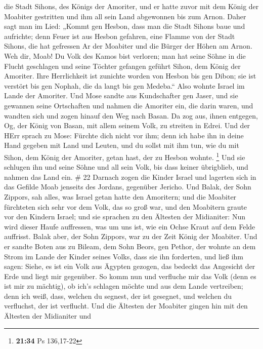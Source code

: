 die Stadt Sihons, des Königs der Amoriter, und er hatte zuvor mit dem
König der Moabiter gestritten und ihm all sein Land abgewonnen bis zum
Arnon.  Daher sagt man im Lied: „Kommt gen Hesbon, dass man
die Stadt Sihons baue und aufrichte;  denn Feuer ist aus
Hesbon gefahren, eine Flamme von der Stadt Sihons, die hat gefressen Ar
der Moabiter und die Bürger der Höhen am Arnon.  Weh dir,
Moab! Du Volk des Kamos bist verloren; man hat seine Söhne in die Flucht
geschlagen und seine Töchter gefangen geführt Sihon, dem König der
Amoriter.  Ihre Herrlichkeit ist zunichte worden von Hesbon
bis gen Dibon; sie ist verstört bis gen Nophah, die da langt bis gen
Medeba.``  Also wohnte Israel im Lande der Amoriter.
 Und Mose sandte aus Kundschafter gen Jaser, und sie
gewannen seine Ortschaften und nahmen die Amoriter ein, die darin waren,
 und wandten sich und zogen hinauf den Weg nach Basan. Da
zog aus, ihnen entgegen, Og, der König von Basan, mit allem seinem Volk,
zu streiten in Edrei.  Und der HErr sprach zu Mose: Fürchte
dich nicht vor ihm; denn ich habe ihn in deine Hand gegeben mit Land und
Leuten, und du sollst mit ihm tun, wie du mit Sihon, dem König der
Amoriter, getan hast, der zu Hesbon wohnte. \footnote{\textbf{21:34} Ps
  136,17-22}  Und sie schlugen ihn und seine Söhne und all
sein Volk, bis dass keiner übrigblieb, und nahmen das Land ein. \# 22
 Darnach zogen die Kinder Israel und lagerten sich in das
Gefilde Moab jenseits des Jordans, gegenüber Jericho.  Und
Balak, der Sohn Zippors, sah alles, was Israel getan hatte den
Amoritern;  und die Moabiter fürchteten sich sehr vor dem
Volk, das so groß war, und den Moabitern graute vor den Kindern Israel;
 und sie sprachen zu den Ältesten der Midianiter: Nun wird
dieser Haufe auffressen, was um uns ist, wie ein Ochse Kraut auf dem
Felde auffrisst. Balak aber, der Sohn Zippors, war zu der Zeit König der
Moabiter.  Und er sandte Boten aus zu Bileam, dem Sohn
Beors, gen Pethor, der wohnte an dem Strom im Lande der Kinder seines
Volks, dass sie ihn forderten, und ließ ihm sagen: Siehe, es ist ein
Volk aus Ägypten gezogen, das bedeckt das Angesicht der Erde und liegt
mir gegenüber.  So komm nun und verfluche mir das Volk (denn
es ist mir zu mächtig), ob ich's schlagen möchte und aus dem Lande
vertreiben; denn ich weiß, dass, welchen du segnest, der ist gesegnet,
und welchen du verfluchst, der ist verflucht.  Und die
Ältesten der Moabiter gingen hin mit den Ältesten der Midianiter und
